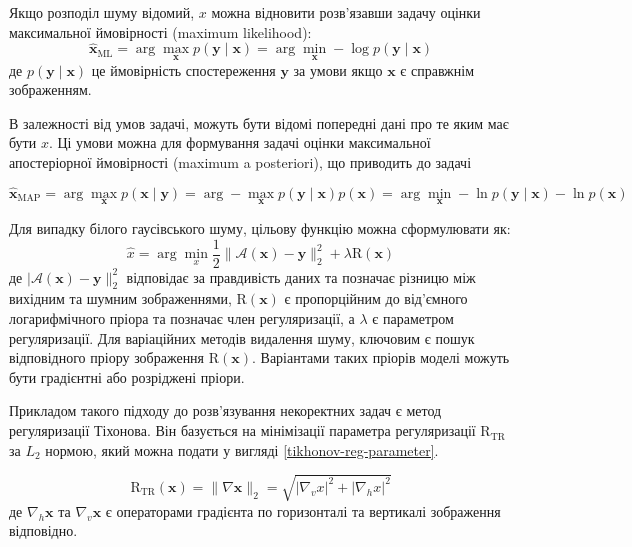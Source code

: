 \documentclass[14pt,a4paper]{extarticle}
\newcounter{e}
\numberwithin{equation}{section}
\numberwithin{figure}{section}
\begin{document}
	Якщо розподіл шуму відомий, $x$ можна відновити розв'язавши задачу оцінки максимальної ймовірності (maximum likelihood):
	$$
	\hat{\boldsymbol{x}}_{\mathrm{ML}}
	= \arg \max_{\boldsymbol{x}} {p (\boldsymbol{y} \mid \boldsymbol{x})}
	= \arg \min_{\boldsymbol{x}} -\log p(\boldsymbol{y} \mid \boldsymbol{x})
	$$
	де $p(\boldsymbol{y} \mid \boldsymbol{x})$ це ймовірність спостереження $\boldsymbol{y}$ за умови якщо $\boldsymbol{x}$ є справжнім зображенням.
	
	В залежності від умов задачі, можуть бути відомі попередні дані про те яким має бути $x$. Ці умови можна для формування  задачі оцінки максимальної апостеріорної ймовірності (maximum a posteriori), що приводить до задачі
	
	$$
		\hat{\boldsymbol{x}}_{\mathrm{MAP}}
		=
		\arg \max_{\boldsymbol{x}} p(\boldsymbol{x} \mid \boldsymbol{y}) 
		=
		\arg -\max_{\boldsymbol{x}} { p(\boldsymbol{y} \mid \boldsymbol{x})} p(\boldsymbol{x})
		=
		\arg \min_{\boldsymbol{x}} -\ln p(\boldsymbol{y} \mid \boldsymbol{x})-\ln p(\boldsymbol{x})
	$$
	
	Для випадку білого гаусівського шуму, цільову функцію можна сформулювати як:
	\begin{equation}
		\label{MAP-avgn}
		\hat{x}=\arg \min_{x} 	\frac{1}{2}\|\mathcal{A}(\boldsymbol{x})-\boldsymbol{y}\|_{2}^{2}+\lambda \mathrm{R}(\boldsymbol{x})
	\end{equation}
	де  $|\mathcal{A}(\boldsymbol{x})-\boldsymbol{y}\|_{2}^{2}$ відповідає за правдивість даних та позначає різницю між вихідним та шумним зображеннями, $\mathrm{R}(\boldsymbol{x})$ є пропорційним до від'ємного логарифмічного пріора та позначає член регуляризації, а $\lambda$ є параметром регуляризації. Для варіаційних методів видалення шуму, ключовим є пошук відповідного пріору зображення $\mathrm{R}(\boldsymbol{x})$. Варіантами таких пріорів моделі можуть бути градієнтні або розріджені пріори.

	Прикладом такого підходу до розв'язування некоректних задач є метод регуляризації Тіхонова. Він базується на мінімізації параметра регуляризації $\mathrm{R}_{\mathrm{TR}}$ за $L_2$ нормою, який можна подати у вигляді \ref{tikhonov-reg-parameter}.
	
	\begin{equation}
		\label{tikhonov-reg-parameter}
		\mathrm{R}_{\mathrm{TR}}(\boldsymbol{x})
		=
		\|\nabla \boldsymbol{x}\|_{2} 
		=
		\sqrt{\left|\nabla_{v} x\right|^{2}+\left|\nabla_{h} x\right|^{2}}
	\end{equation}
	де $\nabla_{h} \boldsymbol{x}$ та $\nabla_{v} \boldsymbol{x}$ є операторами градієнта по горизонталі та вертикалі зображення відповідно.
	
\end{document}
